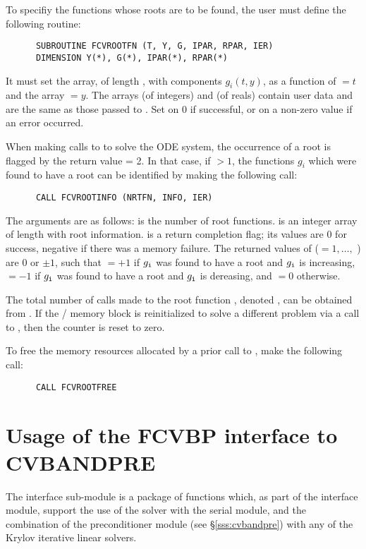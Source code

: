 To specifiy the functions whose roots are to be found, the user must
define the following routine:
\begin{verbatim}
      SUBROUTINE FCVROOTFN (T, Y, G, IPAR, RPAR, IER)
      DIMENSION Y(*), G(*), IPAR(*), RPAR(*)
\end{verbatim}
It must set the  array, of length , with components $g_i(t,y)$,
as a function of  $= t$ and the array  $= y$.  
The arrays  (of integers) and  (of reals) contain user data
and are the same as those passed to .
Set  on 0 if successful, or on a non-zero value if an error occurred.

When making calls to  to solve the ODE system, the occurrence of
a root is flagged by the return value  = 2.  In that case, if
 $> 1$, the functions $g_i$ which were found to have a root can
be identified by making the following call:
\begin{verbatim}
      CALL FCVROOTINFO (NRTFN, INFO, IER)
\end{verbatim}
The arguments are as follows:  is the number of root functions.
 is an integer array of length  with root information.
 is a return completion flag; its values are $0$ for success, 
negative if there was a memory failure.  The returned values of 
($ = 1,\ldots,$ ) are $0$ or $\pm 1$, such that 
 $ = +1$ if $g_{{\tt i}}$ was found to have a root and $g_{{\tt i}}$ is increasing,
 $ = -1$ if $g_{{\tt i}}$ was found to have a root and $g_{{\tt i}}$ is dereasing,
and  $ = 0$ otherwise.

The total number of calls made to the root function ,
denoted , can be obtained from .
If the {\fcvode}/{\cvode} memory block is reinitialized to solve a
different problem via a call to , then the counter
 is reset to zero.

To free the memory resources allocated by a prior call to , make
the following call:
\begin{verbatim}
      CALL FCVROOTFREE
\end{verbatim}


\section{Usage of the FCVBP interface to CVBANDPRE}
The {\fcvbp} interface sub-module is a package of {\C} functions which,
as part of the {\fcvode} interface module, support the use of the
{\cvode} solver with the serial {\nvecs} module, and the combination of
the {\cvbandpre} preconditioner module (see \S\ref{sss:cvbandpre}) with
any of the Krylov iterative linear solvers.

